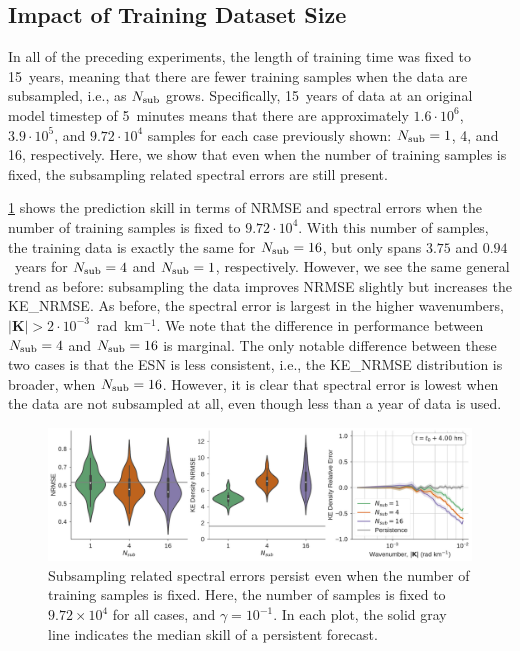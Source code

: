 \subsection{Impact of Training Dataset Size}
\label{subsec:esn-fixed-steps}

In all of the preceding experiments, the length of training time was fixed to
15~years, meaning that there are fewer training samples when the data are
subsampled, i.e., as $N_\text{sub}$ grows.
Specifically, 15~years of data at an original model timestep of 5~minutes means
that there are approximately
$1.6\cdot10^{6}$, $3.9\cdot10^5$, and $9.72\cdot10^4$ samples
for each case previously shown: $N_\text{sub}=1$, 4, and 16, respectively.
Here, we show that even when the number of training samples is fixed, the
subsampling related spectral errors are still present.

\cref{fig:esn-fixed-steps} shows the prediction skill in terms of NRMSE and
spectral errors when the number of training samples is fixed to $9.72\cdot10^4$.
With this number of samples, the training data is exactly the same for
$N_\text{sub}=16$, but only spans $3.75$ and $0.94$~years for $N_\text{sub}=4$ and $N_\text{sub}=1$,
respectively.
However, we see the same general trend as before: subsampling the data improves
NRMSE slightly but increases the KE\_NRMSE.
As before, the spectral error is largest in the higher wavenumbers,
$|\mathbf{K}| > 2\cdot10^{-3}$~rad~km$^{-1}$.
We note that the difference in performance between $N_\text{sub}=4$ and $N_\text{sub}=16$ is
marginal.
The only notable difference between these two cases is that the ESN is less
consistent, i.e., the KE\_NRMSE distribution is broader, when $N_\text{sub}=16$.
However, it is clear that spectral error is lowest when the data are not
subsampled at all, even though less than a year of data is used.

\begin{figure}
    \centering
    \includegraphics[width=\textwidth]{../figures/rc_fixed_steps.pdf}
    \caption{Subsampling related spectral errors persist even when the number of
        training samples is fixed. Here, the number of samples is fixed to
        $9.72\times10^{4}$ for all cases, and $\gamma=10^{-1}$.
        In each plot, the solid gray line indicates the median skill of a persistent
        forecast.
    }
    \label{fig:esn-fixed-steps}
\end{figure}
